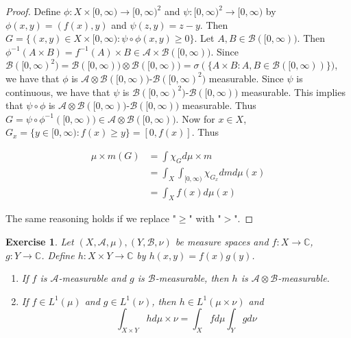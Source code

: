 \documentclass[12pt]{amsart}
\newtheorem{ex}[thm]{Exercise}
\newcommand{\sig}{\sigma}
\newcommand{\C}{\mathbb{C}}
\newcommand{\MA}{\mathcal{A}}
\newcommand{\MB}{\mathcal{B}}
\newcommand{\Rg}{[0,\infty)}
\begin{document}
\begin{proof}
Define $\phi: X \times \Rg \rightarrow \Rg^2$ and $\psi: \Rg^2 \rightarrow \Rg$ by $\phi(x,y) = (f(x),y)$ and $\psi(z,y) = z-y$. Then $G = \{(x,y) \in X \times \Rg: \psi \circ \phi(x,y) \geq 0\}$. Let $A, B \in \MB(\Rg)$. Then $\phi^{-1}(A \times B) = f^{-1}(A) \times B \in \MA \times \MB(\Rg)$. Since $\MB(\Rg^2) = \MB(\Rg) \otimes \MB(\Rg) = \sig(\{A \times B: A, B \in \MB(\Rg)\})$, we have that $\phi$ is $\MA \otimes \MB(\Rg)$-$\MB(\Rg^2)$ measurable. Since $\psi$ is continuous, we have that $\psi$ is $\MB(\Rg^2)$-$\MB(\Rg)$ measurable. This implies that $\psi \circ \phi$ is $\MA \otimes \MB(\Rg)$-$\MB(\Rg)$ measurable. Thus $G = \psi \circ \phi^{-1}(\Rg) \in \MA \otimes \MB(\Rg)$. Now for $x \in X$, $G_x = \{y \in \Rg: f(x) \geq y\} = [0, f(x)]$. Thus 

\begin{align*}
\mu \times m(G) 
&= \int \chi_G d\mu \times m\\
&= \int_X \int_{\Rg} \chi_{G_x} dm d\mu(x)\\
&= \int_X f(x) d\mu(x) 
\end{align*}

The same reasoning holds if we replace "$\geq$" with "$>$".
\end{proof}

\begin{ex}
Let $(X, \MA, \mu), (Y, \MB, \nu)$ be measure spaces and $f:X \rightarrow \C$, $g:Y \rightarrow \C$. Define $h:X \times Y \rightarrow \C$ by $h(x,y) = f(x)g(y)$.

\begin{enumerate}
\item If $f$ is $\MA$-measurable and $g$ is $\MB$-measurable, then $h$ is $\MA \otimes \MB$-measurable.

\item If $f \in L^1(\mu)$ and $g \in L^1(\nu)$, then $h \in L^1(\mu \times \nu)$ and $$\int_{X \times Y}hd \mu \times \nu = \int_X f d\mu \int_Y g d\nu$$
\end{enumerate}
\end{ex}
\end{document}
